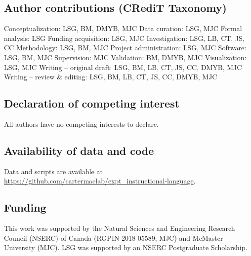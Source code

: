 \documentclass[doc,floatsintext,donotrepeattitle,letterpaper,12pt]{apa7}
\begin{document}
\clearpage

\subsection{Author contributions (CRediT Taxonomy)}

\noindent Conceptualization: LSG, BM, DMYB, MJC \newline
\noindent Data curation: LSG, MJC \newline
\noindent Formal analysis: LSG \newline
\noindent Funding acquisition: LSG, MJC \newline
\noindent Investigation: LSG, LB, CT, JS, CC \newline
\noindent Methodology: LSG, BM, MJC \newline
\noindent Project administration: LSG, MJC \newline
\noindent Software: LSG, BM, MJC \newline
\noindent Supervision: MJC \newline
\noindent Validation: BM, DMYB, MJC \newline
\noindent Visualization: LSG, MJC \newline
\noindent Writing -- original draft: LSG, BM, LB, CT, JS, CC, DMYB, MJC \newline
\noindent Writing -- review \& editing: LSG, BM, LB, CT, JS, CC, DMYB, MJC

\subsection{Declaration of competing interest}

\noindent All authors have no competing interests to declare.

\subsection{Availability of data and code}

\noindent Data and scripts are available at \url{https://github.com/cartermaclab/expt_instructional-language}.

\subsection{Funding}

\noindent This work was supported by the Natural Sciences and Engineering Research Council (NSERC) of Canada (RGPIN-2018-05589; MJC) and McMaster University (MJC). LSG was supported by an NSERC Postgraduate Scholarship.

\clearpage

\printbibliography
\end{document}
